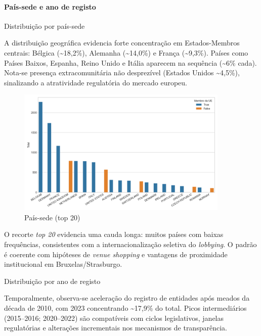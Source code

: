 \paragraph{País-sede e ano de registo}
\begin{table}[!htbp]
\centering
\caption{Distribuição por país-sede}

\end{table}

A distribuição geográfica evidencia forte concentração em Estados-Membros centrais: Bélgica (\textasciitilde18,2\%), Alemanha (\textasciitilde14,0\%) e França (\textasciitilde9,3\%). Países como Países Baixos, Espanha, Reino Unido e Itália aparecem na sequência (\textasciitilde6\% cada). Nota-se presença extracomunitária não desprezível (Estados Unidos \textasciitilde4,5\%), sinalizando a atratividade regulatória do mercado europeu.

\begin{figure}[!htbp]
\centering
\includegraphics[width=0.9\textwidth]{figures/country_distribution_top20.png}
\caption{País-sede (top 20)}
\end{figure}

O recorte \textit{top 20} evidencia uma cauda longa: muitos países com baixas frequências, consistentes com a internacionalização seletiva do \textit{lobbying}. O padrão é coerente com hipóteses de \textit{venue shopping} e vantagens de proximidade institucional em Bruxelas/Strasburgo.

\begin{table}[!htbp]
\centering
\caption{Distribuição por ano de registo}

\end{table}

Temporalmente, observa-se aceleração do registro de entidades após meados da década de 2010, com 2023 concentrando \textasciitilde17,9\% do total. Picos intermediários (2015--2016; 2020--2022) são compatíveis com ciclos legislativos, janelas regulatórias e alterações incrementais nos mecanismos de transparência.

